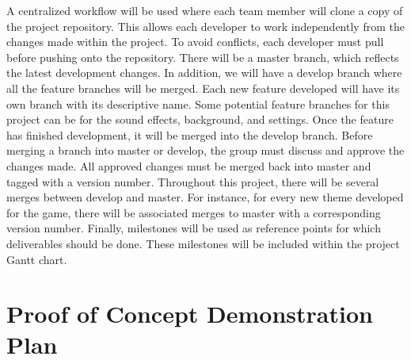 \documentclass{article}
\begin{document}
	A centralized workflow will be used where each team member will clone a copy of the project repository.
	This allows each developer to work independently from the changes made within the project. 
	To avoid conflicts, each developer must pull before pushing onto the repository. 
	There will be a master branch, which reflects the latest development changes. 
	In addition, we will have a develop branch where all the feature branches will be merged.
	Each new feature developed will have its own branch with its descriptive name.
	Some potential feature branches for this project can be for the sound effects, background, and settings. 
	Once the feature has finished development, it will be merged into the develop branch. 
	Before merging a branch into master or develop, the group must discuss and approve the changes made. 
	All approved changes must be merged back into master and tagged with a version number. 
	Throughout this project, there will be several merges between develop and master. 
	For instance, for every new theme developed for the game, there will be associated merges to master with a corresponding version number. Finally, milestones will be used as reference points for which deliverables should be done. These milestones will be included within the project Gantt chart.

	
	\section{Proof of Concept Demonstration Plan}
\end{document}
